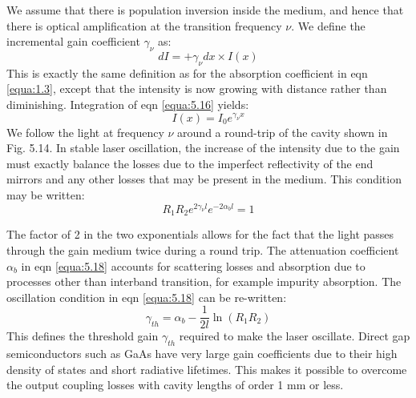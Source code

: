 \documentclass[12pt]{book}
\begin{document}
{We assume that there is population inversion inside the medium, and hence that there is optical amplification at the transition frequency $\nu$. We define the incremental gain coefficient $\gamma_{\nu}$ as:
\begin{equation}\label{equa:5.16}
  dI=+\gamma_{\nu}dx\times I(x)
\end{equation}
This is exactly the same definition as for the absorption coefficient in eqn \ref{equa:1.3}, except that the intensity is now growing with distance rather than diminishing. Integration of eqn \ref{equa:5.16} yields:
\begin{equation}\label{equa:5.17}
  I(x)=I_0e^{\gamma_{\nu}x}
\end{equation}
We follow the light at frequency $\nu$ around a round-trip of the cavity shown in Fig. 5.14. In stable laser oscillation, the increase of the intensity due to the gain must exactly balance the losses due to the imperfect reflectivity of the end mirrors and any other losses that may be present in the medium. This condition may be written:
\begin{equation}\label{equa:5.18}
  R_1R_2e^{2\gamma_{\nu}l}e^{-2\alpha_bl}=1
\end{equation}

The factor of 2 in the two exponentials allows for the fact that the light passes through the gain medium twice during a round trip. The attenuation coefficient $\alpha_b$ in eqn \ref{equa:5.18} accounts for scattering losses and absorption due to processes other than interband transition, for example impurity absorption. The oscillation condition in eqn \ref{equa:5.18} can be re-written:
\begin{equation}\label{equa:5.19}
  \gamma_{th}=\alpha_b-\frac{1}{2l}\ln(R_1R_2)
\end{equation}
This defines the threshold gain $\gamma_{th}$ required to make the laser oscillate. Direct gap semiconductors such as GaAs have very large gain coefficients due to their high density of states and short radiative lifetimes. This makes it possible to overcome the output coupling losses with cavity lengths of order 1 mm or less.

}
\end{document}
